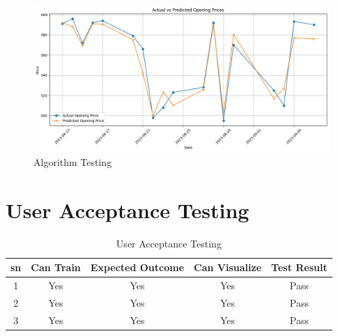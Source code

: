 \documentclass[./main.tex]{subfiles}
\begin{document}
\begin{figure}[H]
    \centering
    \includegraphics[width=1\linewidth]{images/Algorithmtesting.png}
    \caption{Algorithm Testing}
    \label{fig:5.1}
\end{figure}
\section{User Acceptance Testing}
\begin{center}
\begin{table}[H]
  \caption{User Acceptance Testing}
  \begin{tabular}{|c|c|c|c|c|}
    \hline
    \textbf{sn} & \textbf{Can Train} &\textbf{Expected Outcome} &\textbf{Can Visualize} & \textbf{Test Result}   \\
    \hline
    1 & Yes & Yes &Yes & Pass\\
    2 & Yes & Yes &Yes & Pass\\
    3 & Yes & Yes &Yes & Pass \\
    \hline
  \end{tabular}
\end{table}
\end{center}
\end{document}
